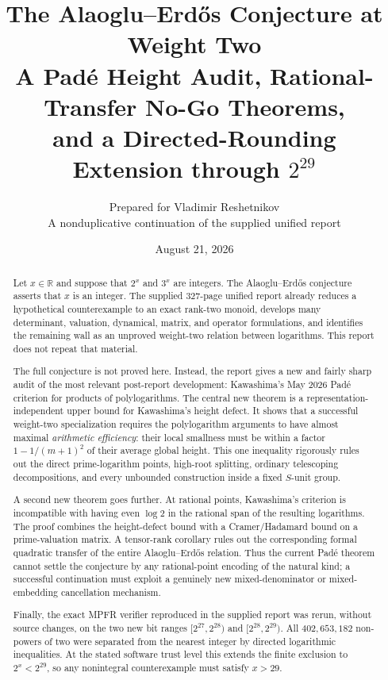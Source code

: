 \documentclass[11pt]{article}
\title{\textbf{The Alaoglu--Erd\H{o}s Conjecture at Weight Two}\\[0.35em]
\large A Pad\'e Height Audit, Rational-Transfer No-Go Theorems,\\
and a Directed-Rounding Extension through $2^{29}$}
\author{Prepared for Vladimir Reshetnikov\\
\small A nonduplicative continuation of the supplied unified report}
\date{August 21, 2026}
\theoremstyle{definition}
\newcommand{\R}{\mathbb R}
\begin{document}
\maketitle

\begin{abstract}
Let $x\in\R$ and suppose that $2^x$ and $3^x$ are integers.  The Alaoglu--Erd\H{o}s
conjecture asserts that $x$ is an integer.  The supplied 327-page unified report already
reduces a hypothetical counterexample to an exact rank-two monoid, develops many determinant,
valuation, dynamical, matrix, and operator formulations, and identifies the remaining wall as
an unproved weight-two relation between logarithms.  This report does not repeat that material.

The full conjecture is not proved here.  Instead, the report gives a new and fairly sharp audit
of the most relevant post-report development: Kawashima's May 2026 Pad\'e criterion for products
of polylogarithms.  The central new theorem is a representation-independent upper bound for
Kawashima's height defect.  It shows that a successful weight-two specialization requires the
polylogarithm arguments to have almost maximal \emph{arithmetic efficiency}: their local
smallness must be within a factor $1-1/(m+1)^2$ of their average global height.  This one
inequality rigorously rules out the direct prime-logarithm points, high-root splitting,
ordinary telescoping decompositions, and every unbounded construction inside a fixed
$S$-unit group.

A second new theorem goes further.  At rational points, Kawashima's criterion is incompatible
with having even $\log 2$ in the rational span of the resulting logarithms.  The proof combines
the height-defect bound with a Cramer/Hadamard bound on a prime-valuation matrix.  A tensor-rank
corollary rules out the corresponding formal quadratic transfer of the entire
Alaoglu--Erd\H{o}s relation.  Thus the current Pad\'e theorem cannot settle the conjecture by
any rational-point encoding of the natural kind; a successful continuation must exploit a
genuinely new mixed-denominator or mixed-embedding cancellation mechanism.

Finally, the exact MPFR verifier reproduced in the supplied report was rerun, without source
changes, on the two new bit ranges $[2^{27},2^{28})$ and $[2^{28},2^{29})$.  All
$402{,}653{,}182$ non-powers of two were separated from the nearest integer by directed
logarithmic inequalities.  At the stated software trust level this extends the finite
exclusion to $2^x<2^{29}$, so any nonintegral counterexample must satisfy $x>29$.
\end{abstract}
\end{document}
